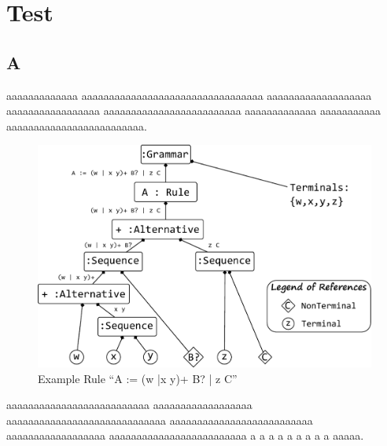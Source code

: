 \chapter{Test}
\section{A}
aaaaaaaaaaaaa aaaaaaaaaaaaaaaaaaaaaaaaaaaaaaaaa aaaaaaaaaaaaaaaaaaa aaaaaaaaaaaaaaaaa aaaaaaaaaaaaaaaaaaaaaaaaa aaaaaaaaaaaaa aaaaaaaaaaa aaaaaaaaaaaaaaaaaaaaaaaaa.
\begin{figure}
\includegraphics[scale=0.7]{gfx/ex/grammarExample} 
\caption{Example Rule ``A := (w |x y)+ B? | z C''}
\end{figure}
\FloatBarrier
aaaaaaaaaaaaaaaaaaaaaaaaaa aaaaaaaaaaaaaaaaaa aaaaaaaaaaaaaaaaaaaaaaaaaaaaa aaaaaaaaaaaaaaaaaaaaaaaaaa aaaaaaaaaaaaaaaaaa aaaaaaaaaaaaaaaaaaaaaaaaa a a a a a a a a a aaaaa.
 

